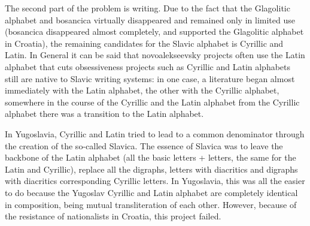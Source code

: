 The second part of the problem is writing. Due to the fact that the Glagolitic alphabet and bosancica virtually disappeared and remained only in limited use (bosancica disappeared almost completely, and supported the Glagolitic alphabet in Croatia), the remaining candidates for the Slavic alphabet is Cyrillic and Latin.
In General it can be said that novoalekseevsky projects often use the Latin alphabet that cuts obsessiveness projects such as Cyrillic and Latin alphabets still are native to Slavic writing systems: in one case, a literature began almost immediately with the Latin alphabet, the other with the Cyrillic alphabet, somewhere in the course of the Cyrillic and the Latin alphabet from the Cyrillic alphabet there was a transition to the Latin alphabet.

In Yugoslavia, Cyrillic and Latin tried to lead to a common denominator through the creation of the so-called Slavica. The essence of Slavica was to leave the backbone of the Latin alphabet (all the basic letters + letters, the same for the Latin and Cyrillic), replace all the digraphs, letters with diacritics and digraphs with diacritics corresponding Cyrillic letters. In Yugoslavia, this was all the easier to do because the Yugoslav Cyrillic and Latin alphabet are completely identical in composition, being mutual transliteration of each other. However, because of the resistance of nationalists in Croatia, this project failed.